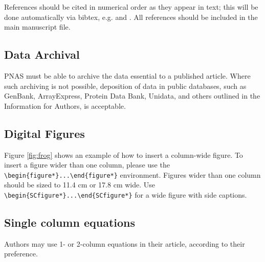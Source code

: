 \documentclass[9pt,twocolumn,twoside]{pnas-new}
\begin{document}
References should be cited in numerical order as they appear in text; this will be done automatically via bibtex, e.g. \cite{belkin2002using} and \cite{berard1994embedding,coifman2005geometric}. All references should be included in the main manuscript file.  

\subsection*{Data Archival}

PNAS must be able to archive the data essential to a published article. Where such archiving is not possible, deposition of data in public databases, such as GenBank, ArrayExpress, Protein Data Bank, Unidata, and others outlined in the Information for Authors, is acceptable.





\subsection*{Digital Figures}
\label{sec:figures}

Figure \ref{fig:frog} shows an example of how to insert a column-wide figure. To insert a figure wider than one column, please use the \verb|\begin{figure*}...\end{figure*}| environment. Figures wider than one column should be sized to 11.4 cm or 17.8 cm wide. Use \verb|\begin{SCfigure*}...\end{SCfigure*}| for a wide figure with side captions.

\subsection*{Single column equations}

Authors may use 1- or 2-column equations in their article, according to their preference.
\end{document}

